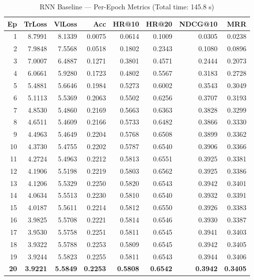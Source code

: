 \documentclass[12pt,a4paper]{report}
\begin{document}
\begin{table}[H]
\centering
\caption{RNN Baseline --- Per-Epoch Metrics (Total time: 145.8 s)}
\small
\begin{tabular}{r r r r r r r r}
\toprule
\textbf{Ep} & \textbf{TrLoss} & \textbf{VlLoss} & \textbf{Acc} & \textbf{HR@10} & \textbf{HR@20} & \textbf{NDCG@10} & \textbf{MRR} \\
\midrule
 1  & 8.7991 & 8.1339 & 0.0075 & 0.0614 & 0.1009 & 0.0305 & 0.0238 \\
 2  & 7.9848 & 7.5568 & 0.0518 & 0.1802 & 0.2343 & 0.1080 & 0.0896 \\
 3  & 7.0007 & 6.4887 & 0.1271 & 0.3801 & 0.4571 & 0.2444 & 0.2073 \\
 4  & 6.0661 & 5.9280 & 0.1723 & 0.4802 & 0.5567 & 0.3183 & 0.2728 \\
 5  & 5.4881 & 5.6646 & 0.1984 & 0.5273 & 0.6002 & 0.3543 & 0.3049 \\
 6  & 5.1113 & 5.5369 & 0.2063 & 0.5502 & 0.6256 & 0.3707 & 0.3193 \\
 7  & 4.8530 & 5.4860 & 0.2169 & 0.5663 & 0.6363 & 0.3828 & 0.3299 \\
 8  & 4.6511 & 5.4609 & 0.2166 & 0.5733 & 0.6482 & 0.3866 & 0.3330 \\
 9  & 4.4963 & 5.4649 & 0.2204 & 0.5768 & 0.6508 & 0.3899 & 0.3362 \\
10  & 4.3730 & 5.4755 & 0.2202 & 0.5787 & 0.6540 & 0.3906 & 0.3366 \\
11  & 4.2724 & 5.4963 & 0.2212 & 0.5813 & 0.6551 & 0.3925 & 0.3381 \\
12  & 4.1906 & 5.5198 & 0.2219 & 0.5803 & 0.6562 & 0.3925 & 0.3386 \\
13  & 4.1206 & 5.5329 & 0.2250 & 0.5820 & 0.6543 & 0.3942 & 0.3401 \\
14  & 4.0634 & 5.5513 & 0.2230 & 0.5810 & 0.6540 & 0.3932 & 0.3391 \\
15  & 4.0187 & 5.5611 & 0.2214 & 0.5812 & 0.6550 & 0.3926 & 0.3383 \\
16  & 3.9825 & 5.5708 & 0.2221 & 0.5814 & 0.6546 & 0.3930 & 0.3387 \\
17  & 3.9530 & 5.5758 & 0.2251 & 0.5811 & 0.6545 & 0.3941 & 0.3403 \\
18  & 3.9322 & 5.5788 & 0.2253 & 0.5809 & 0.6545 & 0.3942 & 0.3405 \\
19  & 3.9244 & 5.5823 & 0.2255 & 0.5811 & 0.6543 & 0.3944 & 0.3406 \\
\textbf{20} & \textbf{3.9221} & \textbf{5.5849} & \textbf{0.2253} & \textbf{0.5808} & \textbf{0.6542} & \textbf{0.3942} & \textbf{0.3405} \\
\bottomrule
\end{tabular}
\label{tab:rnn_log}
\end{table}
\end{document}
